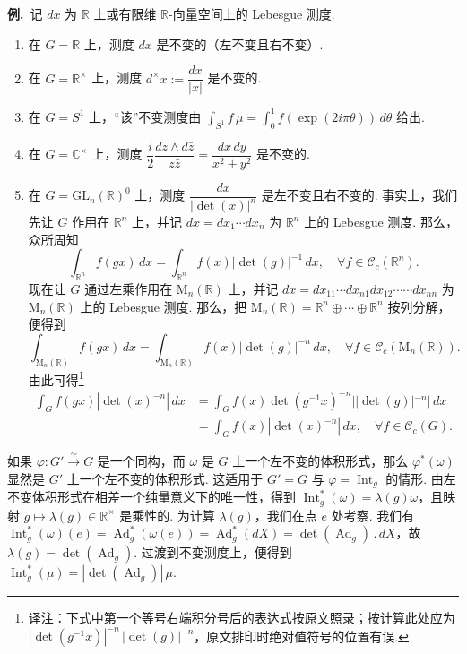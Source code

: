 \noindent\textbf{例.}\ 记 $dx$ 为 $\mathbb R$ 上或有限维 $\mathbb R$-向量空间上的 Lebesgue 测度.
\begin{enumerate}[label=\roman*)]
\item 在 $G=\mathbb R$ 上，测度 $dx$ 是不变的（左不变且右不变）.
\item 在 $G=\mathbb R^{\times}$ 上，测度 $d^{\times}x:=\dfrac{dx}{|x|}$ 是不变的.
\item 在 $G=S^{1}$ 上，``该''不变测度由 $\int_{S^{1}}f\,\mu=\int_{0}^{1}f(\exp(2i\pi\theta))\,d\theta$ 给出.
\item 在 $G=\mathbb C^{\times}$ 上，测度 $\dfrac{i}{2}\dfrac{dz\wedge d\bar z}{z\bar z}=\dfrac{dx\,dy}{x^{2}+y^{2}}$ 是不变的.
\item 在 $G=\mathrm{GL}_n(\mathbb R)^{0}$ 上，测度 $\dfrac{dx}{|\det(x)|^{n}}$ 是左不变且右不变的. 事实上，我们先让 $G$ 作用在 $\mathbb R^{n}$ 上，并记 $dx=dx_1\cdots dx_n$ 为 $\mathbb R^{n}$ 上的 Lebesgue 测度. 那么，众所周知
\[
\int_{\mathbb R^{n}}f(gx)\,dx=\int_{\mathbb R^{n}}f(x)|\det(g)|^{-1}\,dx,\quad\forall f\in\mathcal C_c(\mathbb R^{n}).
\]
现在让 $G$ 通过左乘作用在 $\mathrm{M}_n(\mathbb R)$ 上，并记 $dx=dx_{11}\cdots dx_{n1}dx_{12}\cdots\cdots dx_{nn}$ 为 $\mathrm{M}_n(\mathbb R)$ 上的 Lebesgue 测度. 那么，把 $\mathrm{M}_n(\mathbb R)=\mathbb R^{n}\oplus\cdots\oplus\mathbb R^{n}$ 按列分解，便得到
\[
\int_{\mathrm{M}_n(\mathbb R)}f(gx)\,dx=\int_{\mathrm{M}_n(\mathbb R)}f(x)|\det(g)|^{-n}\,dx,\quad\forall f\in\mathcal C_c(\mathrm{M}_n(\mathbb R)).
\]
由此可得\footnote{译注：下式中第一个等号右端积分号后的表达式按原文照录；按计算此处应为 $|\det(g^{-1}x)|^{-n}\,|\det(g)|^{-n}$，原文排印时绝对值符号的位置有误.}
\begin{align*}
\int_{G}f(gx)|\det(x)^{-n}|\,dx
&=\int_{G}f(x)\det(g^{-1}x)^{-n}||\det(g)|^{-n}|\,dx\\
&=\int_{G}f(x)|\det(x)^{-n}|\,dx,\quad\forall f\in\mathcal C_c(G).
\end{align*}
\end{enumerate}

\begin{remark*}
如果 $\varphi:G'\xrightarrow{\ \sim\ }G$ 是一个同构，而 $\omega$ 是 $G$ 上一个左不变的体积形式，那么 $\varphi^{*}(\omega)$ 显然是 $G'$ 上一个左不变的体积形式. 这适用于 $G'=G$ 与 $\varphi=\operatorname{Int}_g$ 的情形. 由左不变体积形式在相差一个纯量意义下的唯一性，得到 $\operatorname{Int}_g^{*}(\omega)=\lambda(g)\omega$，且映射 $g\mapsto\lambda(g)\in\mathbb R^{\times}$ 是乘性的. 为计算 $\lambda(g)$，我们在点 $e$ 处考察. 我们有 $\operatorname{Int}_g^{*}(\omega)(e)=\operatorname{Ad}_g^{*}(\omega(e))=\operatorname{Ad}_g^{*}(dX)=\det(\operatorname{Ad}_g)\,.\,dX$，故 $\lambda(g)=\det(\operatorname{Ad}_g)$. 过渡到不变测度上，便得到 $\operatorname{Int}_g^{*}(\mu)=|\det(\operatorname{Ad}_g)|\,\mu$.
\end{remark*}

